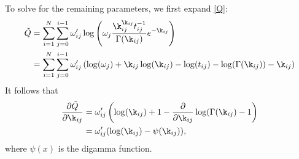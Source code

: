 \documentclass[12pt,leqno]{article}
\begin{document}
To solve for the remaining parameters, we first expand \eqref{Q}:
\begin{equation}\label{Q1}
  \begin{split}
    \tilde{Q} &= \sum_{i=1}^N\sum_{j=0}^{i-1}\omega'_{ij}\log\left(\omega_j\frac{\k_{ij}^{\k_{ij}}t_{ij}^{-1}}
          {\Gamma(\k_{ij})}e^{-\k_{ij}} \right)\\
    &= \sum_{i=1}^N\sum_{j=0}^{i-1}\omega'_{ij}\left(\log(\omega_j)+\k_{ij}\log(\k_{ij}) - \log(t_{ij}) 
          -\log(\Gamma(\k_{ij})) -\k_{ij}\right)\\
  \end{split}
\end{equation}
It follows that
\begin{equation} \label{dQ_dk}
  \begin{split}
  \frac{\partial\tilde{Q}}{\partial\k_{ij}} &= \omega'_{ij}\left(\log(\k_{ij}) + 1 -\frac{\partial}{\partial\k_{ij}}\log(\Gamma(\k_{ij}) -1\right) \\
    &= \omega'_{ij}(\log(\k_{ij}) - \psi(\k_{ij})),
  \end{split}
\end{equation}
where $\psi(x)$ is the digamma function.
\end{document}
